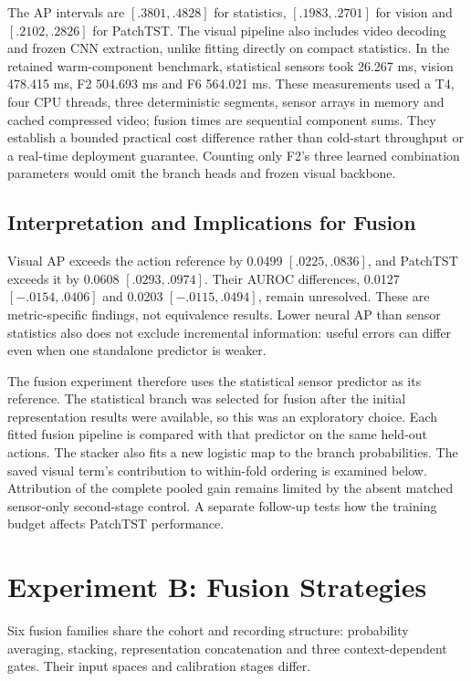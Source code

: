 The AP intervals are $[.3801,.4828]$ for statistics, $[.1983,.2701]$ for vision and
$[.2102,.2826]$ for PatchTST. The visual pipeline also includes video decoding and
frozen CNN extraction, unlike fitting directly on compact statistics. In the retained
warm-component benchmark, statistical sensors took 26.267 ms, vision 478.415 ms, F2
504.693 ms and F6 564.021 ms. These measurements used a T4, four CPU threads, three
deterministic segments, sensor arrays in memory and cached compressed video; fusion
times are sequential component sums. They establish a bounded practical cost difference
rather than cold-start throughput or a real-time deployment guarantee. Counting only
F2's three learned combination parameters would omit the branch heads and frozen visual
backbone.

\subsection{Interpretation and Implications for Fusion}
Visual AP exceeds the action reference by 0.0499 $[.0225,.0836]$, and PatchTST exceeds
it by 0.0608 $[.0293,.0974]$. Their AUROC differences, 0.0127 $[-.0154,.0406]$ and
0.0203 $[-.0115,.0494]$, remain unresolved. These are metric-specific findings, not
equivalence results. Lower neural AP than sensor statistics also does not exclude
incremental information: useful errors can differ even when one standalone predictor is
weaker.

The fusion experiment therefore uses the statistical sensor predictor as its reference.
The statistical branch was selected for fusion after the initial representation results
were available, so this was an exploratory choice.
Each fitted fusion pipeline is compared with that predictor on the same held-out
actions. The stacker also fits a new logistic map to the branch probabilities. The saved
visual term's contribution to within-fold ordering is examined below. Attribution of the
complete pooled gain remains limited by the absent matched sensor-only second-stage
control. A separate follow-up tests how the training budget affects PatchTST
performance.

\section{Experiment B: Fusion Strategies}
Six fusion families share the cohort and recording structure: probability averaging,
stacking, representation concatenation and three context-dependent gates. Their input
spaces and calibration stages differ.

